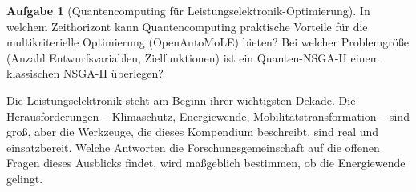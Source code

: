 ﻿\documentclass[a4paper,12pt,openany,oneside]{book}
\theoremstyle{definition}
\newtheorem{aufgabe}{Aufgabe}[chapter]
\begin{document}
\begin{aufgabe}[Quantencomputing f\"ur Leistungselektronik-Optimierung]
  In welchem Zeithorizont kann Quantencomputing praktische Vorteile f\"ur die
  multikriterielle Optimierung (OpenAutoMoLE) bieten? Bei welcher Problemgr\"o\ss{}e
  (Anzahl Entwurfsvariablen, Zielfunktionen) ist ein Quanten-NSGA-II einem klassischen
  NSGA-II \"uberlegen?
\end{aufgabe}

\medskip

Die Leistungselektronik steht am Beginn ihrer wichtigsten Dekade. Die Herausforderungen --
Klimaschutz, Energiewende, Mobilit\"atstransformation -- sind gro\ss{}, aber die Werkzeuge,
die dieses Kompendium beschreibt, sind real und einsatzbereit. Welche Antworten die
Forschungsgemeinschaft auf die offenen Fragen dieses Ausblicks findet, wird ma\ss{}geblich
bestimmen, ob die Energiewende gelingt.
\end{document}
